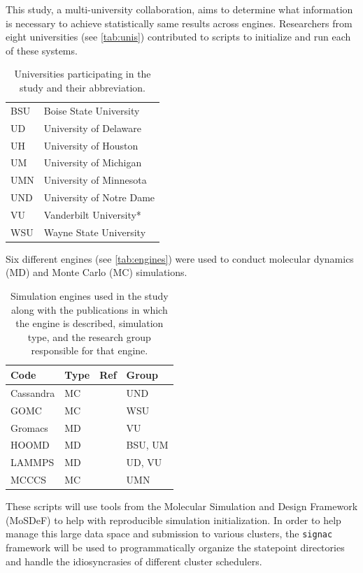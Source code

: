 This study, a multi-university collaboration, aims to determine what information is necessary to achieve statistically same results across engines.
Researchers from eight universities (see \autoref{tab:unis}) contributed to scripts to initialize and run each of these systems.
\begin{table}[h!]
\caption{Universities participating in the study and their abbreviation.}\label{tab:unis}
\centering
\begin{tabular}{ll}
BSU & Boise State University \\
UD & University of Delaware \\
UH & University of Houston \\
UM & University of Michigan \\
UMN & University of Minnesota \\
UND & University of Notre Dame \\
VU & Vanderbilt University* \\
WSU & Wayne State University
\end{tabular}
\end{table}
Six different engines (see \autoref{tab:engines}) were used to conduct molecular dynamics (MD) and Monte Carlo (MC) simulations.
\begin{table}[h!]
\caption{Simulation engines used in the study along with the publications in which the engine is described, simulation type, and the research group responsible for that engine.}\label{tab:engines}
\centering
\begin{tabular}{llll}
Code      & Type & Ref             & Group   \\ \hline
Cassandra & MC   & \cite{Shah2017} & UND     \\
GOMC      & MC   & \cite{Shah2017} & WSU     \\
Gromacs   & MD   & \cite{ABRAHAM201519, Pall2015, Smith2013, Lindahl2001, BERENDSEN199543, https://doi.org/10.1002/jcc.20291, Hess2008} & VU      \\
HOOMD     & MD   & \cite{Anderson2020, Nguyen2011a, Glaser2020a, Lebard2012} & BSU, UM \\
LAMMPS    & MD   & \cite{LAMMPS} & UD, VU  \\
MCCCS     & MC   & \cite{C8SC05340E,Josephson2019} & UMN    
\end{tabular}
\end{table}
These scripts will use tools from the Molecular Simulation and Design Framework (MoSDeF) to help with reproducible simulation initialization.
In order to help manage this large data space and submission to various clusters, the \texttt{signac} framework will be used to programmatically organize the statepoint directories and handle the idiosyncrasies of different cluster schedulers.
